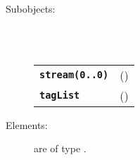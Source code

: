 \begin{description}
  \item[Subobjects:] \hfill \\
\ 
    \begin{tabular}{ll}
      \texttt{\textbf{stream(0..0)}} & (\Jref{module}{???}) \\
      \texttt{\textbf{tagList}} & (\Jref{module}{List}) \\
    \end{tabular}
\vspace{3mm}

  \item[Elements:] are of type .


\end{description}

